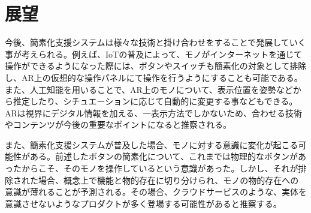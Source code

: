 
\chapter{展望}
\label{chap:outlook}

今後、簡素化支援システムは様々な技術と掛け合わせをすることで発展していく事が考えられる。例えば、IoTの普及によって、モノがインターネットを通じて操作ができるようになった際には、ボタンやスイッチも簡素化の対象として排除し、AR上の仮想的な操作パネルにて操作を行うようにすることも可能である。また、人工知能を用いることで、AR上のモノについて、表示位置を姿勢などから推定したり、シチュエーションに応じて自動的に変更する事などもできる。ARは視界にデジタル情報を加える、一表示方法でしかないため、合わせる技術やコンテンツが今後の重要なポイントになると推察される。

また、簡素化支援システムが普及した場合、モノに対する意識に変化が起こる可能性がある。前述したボタンの簡素化について、これまでは物理的なボタンがあったからこそ、そのモノを操作しているという意識があった。しかし、それが排除された場合、概念上で機能と物的存在に切り分けられ、モノの物的存在への意識が薄れることが予測される。その場合、クラウドサービスのような、実体を意識させないようなプロダクトが多く登場する可能性があると推察する。
